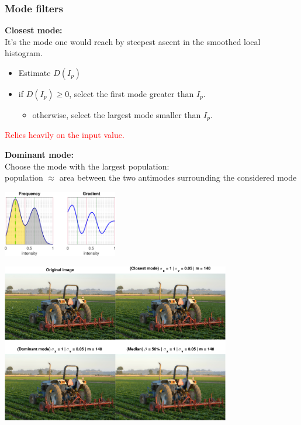 \documentclass [10 pt, xcolor=pdftex,x11names,table]{beamer}
\begin{document}
\begin{frame}
    \frametitle{Mode filters}
     \textbf{Closest mode:}\\
     It's the mode one would reach by steepest ascent in the smoothed local histogram. \\
   
     \begin{itemize}
     \item Estimate $D(I_p)$
     \item if $D(I_p)\geq 0$, select the first mode greater than $I_p$.
     \begin{itemize} \item otherwise, select the largest mode smaller than $I_p$.\end{itemize}
     \end{itemize}
    \textcolor{red}{Relies heavily on the input value.}

    \textbf{Dominant mode:}\\
     Choose the mode with the largest population:\\
     population $\approx$ area between the two antimodes surrounding the considered mode
    \begin{center}
    \includegraphics[width=5cm]{dominant_hist}
    \end{center}
\end{frame}

\begin{frame}
    \begin{center}
    \includegraphics[width=10cm]{tractor}
    \end{center}
\end{frame}
\end{document}
